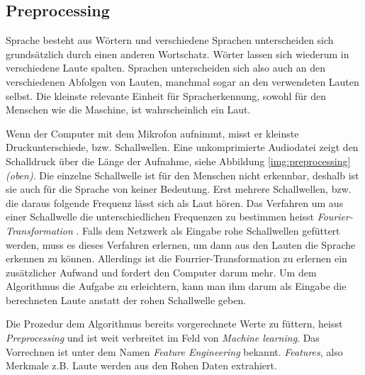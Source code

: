 \subsection{Preprocessing}
Sprache besteht aus Wörtern und verschiedene Sprachen unterscheiden sich grundsätzlich durch einen anderen Wortschatz. Wörter lassen sich wiederum in verschiedene Laute spalten. Sprachen unterscheiden sich also auch an den verschiedenen Abfolgen von Lauten, manchmal sogar an den verwendeten Lauten selbst. Die kleinste relevante Einheit für Spracherkennung, sowohl für den Menschen wie die Maschine, ist wahrscheinlich ein Laut.

Wenn der Computer mit dem Mikrofon aufnimmt, misst er kleinste Druckunterschiede, bzw. Schallwellen. Eine unkomprimierte Audiodatei zeigt den Schalldruck über die Länge der Aufnahme, siehe Abbildung \ref{img:preprocessing} \textit{(oben)}.
Die einzelne Schallwelle ist für den Menschen nicht erkennbar, deshalb ist sie auch für die Sprache von keiner Bedeutung. Erst mehrere Schallwellen, bzw. die daraus folgende Frequenz lässt sich als Laut hören. 
Das Verfahren um aus einer Schallwelle die unterschiedlichen Frequenzen zu bestimmen heisst \textit{Fourier-Transformation} \cite{fourrier}. Falls dem Netzwerk als Eingabe rohe Schallwellen gefüttert werden, muss es dieses Verfahren erlernen, um dann aus den Lauten die Sprache erkennen zu können. Allerdings ist die Fourrier-Transformation zu erlernen ein zusätzlicher Aufwand und fordert den Computer darum mehr. Um dem Algorithmus die Aufgabe zu erleichtern, kann man ihm darum als Eingabe die berechneten Laute anstatt der rohen Schallwelle geben.

Die Prozedur dem Algorithmus bereits vorgerechnete Werte zu füttern, heisst \textit{Preprocessing} und ist weit verbreitet im Feld von \textit{Machine learning}. Das Vorrechnen ist unter dem Namen \textit{Feature Engineering} bekannt. \textit{Features}, also Merkmale z.B. Laute werden aus den Rohen Daten extrahiert. \parencite[vgl.][]{chollet}

